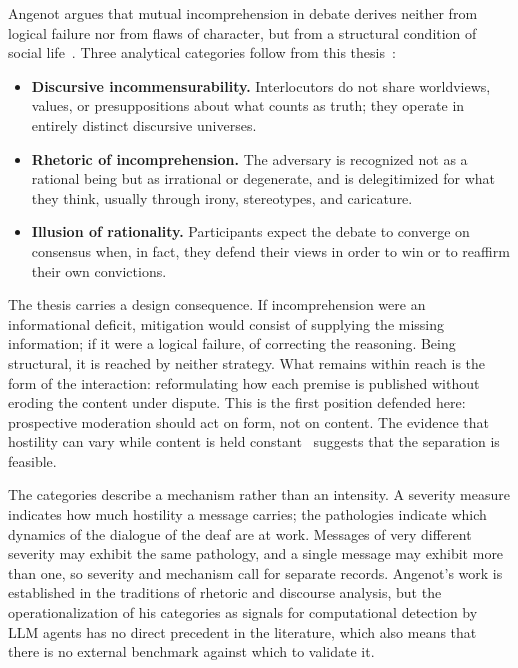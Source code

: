 \documentclass[conference]{IEEEtran}
\begin{document}
Angenot argues that mutual incomprehension in debate derives neither from
logical failure nor from flaws of character, but from a structural condition
of social life~\cite{angenot2008dialogues}. Three analytical categories follow
from this thesis~\cite{angenot2008dialogues,angenot2010discurso}:

\begin{itemize}
\item \textbf{Discursive incommensurability.} Interlocutors do not share
worldviews, values, or presuppositions about what counts as truth; they
operate in entirely distinct discursive universes.
\item \textbf{Rhetoric of incomprehension.} The adversary is recognized not as
a rational being but as irrational or degenerate, and is delegitimized for
what they think, usually through irony, stereotypes, and caricature.
\item \textbf{Illusion of rationality.} Participants expect the debate to
converge on consensus when, in fact, they defend their views in order to win
or to reaffirm their own convictions.
\end{itemize}

The thesis carries a design consequence. If incomprehension were an
informational deficit, mitigation would consist of supplying the missing
information; if it were a logical failure, of correcting the reasoning. Being
structural, it is reached by neither strategy. What remains within reach is
the form of the interaction: reformulating how each premise is published
without eroding the content under dispute. This is the first position
defended here: prospective moderation should act on form, not on content. The
evidence that hostility can vary while content is held
constant~\cite{mutz2005new} suggests that the separation is feasible.

The categories describe a mechanism rather than an intensity. A severity
measure indicates how much hostility a message carries; the pathologies
indicate which dynamics of the dialogue of the deaf are at work. Messages of
very different severity may exhibit the same pathology, and a single message
may exhibit more than one, so severity and mechanism call for separate
records. Angenot's work is established in the traditions of rhetoric and
discourse analysis, but the operationalization of his categories as signals
for computational detection by LLM agents has no direct precedent in the
literature, which also means that there is no external benchmark against
which to validate it.
\end{document}
